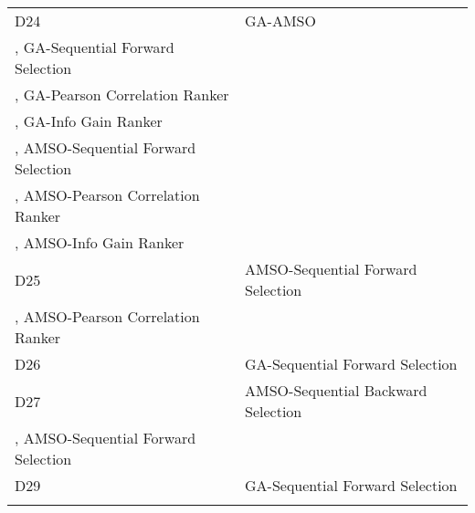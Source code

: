 \begin{table}
\begin{tabular}{ll}
D24&GA-AMSO\\
, GA-Sequential Forward Selection\\
, GA-Pearson Correlation Ranker\\
, GA-Info Gain Ranker\\
, AMSO-Sequential Forward Selection\\
, AMSO-Pearson Correlation Ranker\\
, AMSO-Info Gain Ranker\\
D25&AMSO-Sequential Forward Selection\\
, AMSO-Pearson Correlation Ranker\\
D26&GA-Sequential Forward Selection\\
D27&AMSO-Sequential Backward Selection\\
, AMSO-Sequential Forward Selection\\
D29&GA-Sequential Forward Selection\\
\noalign{\smallskip}\hline
\end{tabular}
\end{table}
